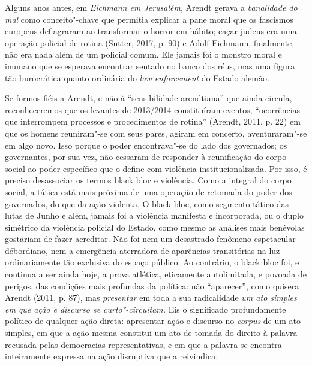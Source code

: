 Alguns anos antes, em \emph{Eichmann em Jerusalém}, Arendt gerava a
\emph{banalidade do mal} como conceito"-chave que permitia explicar a
pane moral que os fascismos europeus deflagraram ao transformar o horror
em hábito; caçar judeus era uma operação policial de rotina (Sutter,
2017, p. 90) e Adolf Eichmann, finalmente, não era nada além de um
policial comum. Ele jamais foi o monstro moral e inumano que se esperava
encontrar sentado no banco dos réus, mas uma figura tão burocrática
quanto ordinária do \emph{law enforcement} do Estado alemão.

Se formos fiéis a Arendt, e não à ``sensibilidade arendtiana'' que ainda
circula, reconheceremos que os levantes de 2013/2014 constituíram
eventos, ``ocorrências que interrompem processos e procedimentos de
rotina'' (Arendt, 2011, p. 22) em que os homens reuniram"-se com seus
pares, agiram em concerto, aventuraram"-se em algo novo. Isso porque o
poder encontrava"-se do lado dos governados; os governantes, por sua vez,
não cessaram de responder à reunificação do corpo social ao poder
específico que o define com violência institucionalizada. Por isso, é
preciso desassociar os termos black bloc e violência. Como a
integral do corpo social, a tática está mais próxima de uma operação de
retomada do poder dos governados, do que da ação violenta. O black
bloc, como segmento tático das lutas de Junho e além, jamais foi a
violência manifesta e incorporada, ou o duplo simétrico da violência
policial do Estado, como mesmo as análises mais benévolas gostariam de
fazer acreditar. Não foi nem um desastrado fenômeno espetacular
débordiano, nem a emergência aterradora de aparências transitórias na
luz ordinariamente tão exclusiva do espaço público. Ao contrário, o
black bloc foi, e continua a ser ainda hoje, a prova atlética,
eticamente autolimitada, e povoada de perigos, das condições mais
profundas da política: não ``aparecer'', como quisera Arendt (2011, p.
87), mas \emph{presentar} em toda a sua radicalidade \emph{um ato
simples em que ação e discurso se curto"-circuitam.} Eis o significado
profundamente político de qualquer ação direta: apresentar ação e
discurso no \emph{corpus} de um ato simples, em que a ação mesma
constitui um ato de tomada do direito à palavra recusada pelas
democracias representativas, e em que a palavra se encontra inteiramente
expressa na ação disruptiva que a reivindica.

